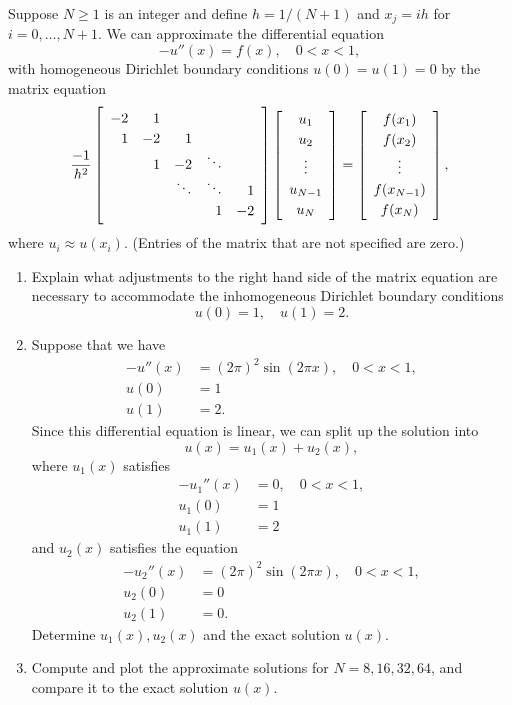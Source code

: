 Suppose $N\ge 1$ is an integer and define $h = 1/(N+1)$ and $x_j = ih$ for $i=0,\ldots, N+1$. We can approximate the differential equation
\[
-u''(x) = f(x), \quad 0<x<1,
\]
with homogeneous Dirichlet boundary conditions $u(0)=u(1) = 0$ by the matrix equation
\[
{-1 \over h^2} \left[\begin{array}{rrrrr}
              -2 & 1 \\[0.25em]
               1 & -2 & 1 \\
                 &  1  & -2 & \ddots \\
                 & & \ddots & \ddots & 1 \\[0.25em]
                 & & & 1 & -2 
               \end{array}\right]
          \left[\begin{array}{c} u_1 \\[0.25em] u_2 \\[0.25em] \vdots \\[0.25em] u_{N-1} \\[0.25em] u_N \end{array}\right]
 =   \left[\begin{array}{c} f(x_1) \\[0.25em] f(x_2) \\[0.25em] \vdots \\[0.25em] f(x_{N-1}) \\[0.25em] f(x_N) \end{array}\right],
\]
where $u_i \approx u(x_i)$.  (Entries of the matrix that are not specified are zero.)
\begin{enumerate}
\item Explain what adjustments to the right hand side of the matrix equation are necessary to accommodate the inhomogeneous Dirichlet boundary conditions
\[
u(0)=1,\quad  u(1)=2.
\]
\item Suppose that we have 
\begin{align*}
-u''(x) &= (2\pi)^2 \sin(2\pi x), \quad 0<x<1,\\
u(0) &= 1\\
u(1) &= 2.
\end{align*}
Since this differential equation is linear, we can split up the solution into 
$$u(x) = u_1(x) + u_2(x),$$ 
where $u_1(x)$ satisfies 
\begin{align*}
-u_1''(x) &= 0, \quad 0<x<1,\\
u_1(0) &= 1\\
u_1(1) &= 2
\end{align*}
and $u_2(x)$ satisfies the equation 
\begin{align*}
-u_2''(x) &= (2\pi)^2 \sin(2\pi x), \quad 0<x<1,\\
u_2(0) &= 0\\
u_2(1) &= 0.
\end{align*}
Determine $u_1(x), u_2(x)$ and the exact solution $u(x)$.  %
\item Compute and plot the approximate solutions for $N=8, 16, 32, 64$, and compare it to the exact solution $u(x)$.  
\end{enumerate} 


